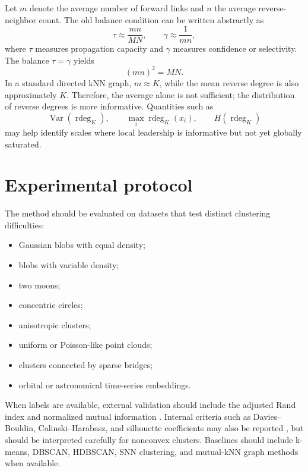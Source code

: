 \documentclass[pdflatex,sn-mathphys-num]{sn-jnl}
\theoremstyle{thmstyleone}
\theoremstyle{thmstyletwo}
\theoremstyle{thmstylethree}
\newcommand{\rdeg}{\operatorname{rdeg}}
\begin{document}
Let $m$ denote the average number of forward links and $n$ the average reverse-neighbor count. The old balance condition can be written abstractly as
\begin{equation}
\tau\approx \frac{mn}{MN},\qquad \gamma\approx\frac{1}{mn},
\end{equation}
where $\tau$ measures propagation capacity and $\gamma$ measures confidence or selectivity. The balance $\tau=\gamma$ yields
\begin{equation}
(mn)^2=MN.
\end{equation}
In a standard directed kNN graph, $m\approx K$, while the mean reverse degree is also approximately $K$. Therefore, the average alone is not sufficient; the distribution of reverse degrees is more informative. Quantities such as
\begin{equation}
\operatorname{Var}(\rdeg_K),\qquad \max_i\rdeg_K(x_i),\qquad H(\rdeg_K)
\end{equation}
may help identify scales where local leadership is informative but not yet globally saturated.

\section{Experimental protocol}\label{sec:experimental_protocol}

The method should be evaluated on datasets that test distinct clustering difficulties:
\begin{itemize}
    \item Gaussian blobs with equal density;
    \item blobs with variable density;
    \item two moons;
    \item concentric circles;
    \item anisotropic clusters;
    \item uniform or Poisson-like point clouds;
    \item clusters connected by sparse bridges;
    \item orbital or astronomical time-series embeddings.
\end{itemize}

When labels are available, external validation should include the adjusted Rand index and normalized mutual information \citep{HubertArabie1985,VinhEppsBailey2010}. Internal criteria such as Davies--Bouldin, Calinski--Harabasz, and silhouette coefficients may also be reported \citep{DaviesBouldin1979,CalinskiHarabasz1974,Rousseeuw1987}, but should be interpreted carefully for nonconvex clusters. Baselines should include k-means, DBSCAN, HDBSCAN, SNN clustering, and mutual-kNN graph methods when available.
\end{document}
